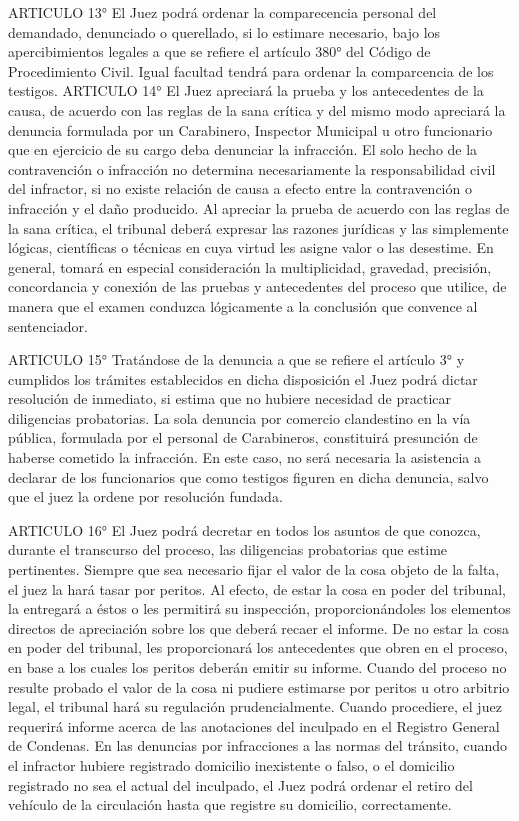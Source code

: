     ARTICULO 13° El Juez podrá ordenar la comparecencia personal del demandado, denunciado o querellado, si lo estimare necesario, bajo los apercibimientos legales a que se refiere el artículo 380° del Código de Procedimiento Civil. Igual facultad tendrá para ordenar la comparcencia de los testigos.
    ARTICULO 14° El Juez apreciará la prueba y los antecedentes de la causa, de acuerdo con las reglas de la sana crítica y del mismo modo apreciará la denuncia formulada por un Carabinero, Inspector Municipal u otro funcionario que en ejercicio de su cargo deba denunciar la infracción. El solo hecho de la contravención o infracción no determina necesariamente la responsabilidad civil del infractor, si no existe relación de causa a efecto entre la contravención o infracción y el daño producido.
    Al apreciar la prueba de acuerdo con las reglas de la sana crítica, el tribunal deberá expresar las razones jurídicas y las simplemente lógicas, científicas o técnicas en cuya virtud les asigne valor o las desestime. En general, tomará en especial consideración la multiplicidad, gravedad, precisión, concordancia y conexión de las pruebas y antecedentes del proceso que utilice, de manera que el examen conduzca lógicamente a la conclusión que convence al sentenciador.

    ARTICULO 15° Tratándose de la denuncia a que se refiere el artículo 3° y cumplidos los trámites establecidos en dicha disposición el Juez podrá dictar resolución de inmediato, si estima que no hubiere necesidad de practicar diligencias probatorias.
    La sola denuncia por comercio clandestino en la vía pública, formulada por el personal de Carabineros, constituirá presunción de haberse cometido la infracción. En este caso, no será necesaria la asistencia a declarar de los funcionarios que como testigos figuren en dicha denuncia, salvo que el juez la ordene por resolución fundada.

    ARTICULO 16° El Juez podrá decretar en todos los asuntos de que conozca, durante el transcurso del proceso, las diligencias probatorias que estime pertinentes.
    Siempre que sea necesario fijar el valor de la cosa objeto de la falta, el juez la hará tasar por peritos.
Al efecto, de estar la cosa en poder del tribunal, la entregará a éstos o les permitirá su inspección, proporcionándoles los elementos directos de apreciación sobre los que deberá recaer el informe. De no estar la cosa en poder del tribunal, les proporcionará los antecedentes que obren en el proceso, en base a los cuales los peritos deberán emitir su informe. Cuando del proceso no resulte probado el valor de la cosa ni pudiere estimarse por peritos u otro arbitrio legal, el tribunal hará su regulación prudencialmente.
    Cuando procediere, el juez requerirá informe acerca de las anotaciones del inculpado en el Registro General de Condenas.
    En las denuncias por infracciones a las normas del tránsito, cuando el infractor hubiere registrado domicilio inexistente o falso, o el domicilio registrado no sea el actual del inculpado, el Juez podrá ordenar el retiro del vehículo de la circulación hasta que registre su domicilio, correctamente.

